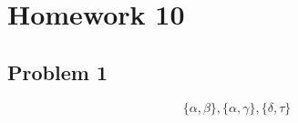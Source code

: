 \chapter{Homework 10}

\section{Problem 1}

$$
\{\alpha, \beta\}, \{\alpha, \gamma\}, \{\delta, \tau \}
$$
